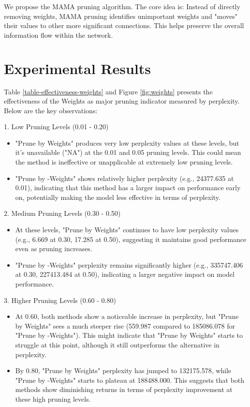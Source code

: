 \documentclass{article} %
\begin{document}
We propose the MAMA pruning algorithm. The core idea is: Instead of directly removing weights, MAMA pruning identifies unimportant weights and "moves" their values to other more significant connections. This helps preserve the overall information flow within the network.

\section{Experimental Results}
\label{res}

Table \ref{table-effectiveness-weights} and Figure \ref{fig:weights} presents the effectiveness of the Weights as major pruning indicator measured by perplexity. Below are the key observations:

1. Low Pruning Levels (0.01 - 0.20)
\begin{itemize}
    \item "Prune by Weights" produces very low perplexity values at these levels, but it's unavailable ("NA") at the 0.01 and 0.05 pruning levels. This could mean the method is ineffective or unapplicable at extremely low pruning levels.
    \item "Prune by -Weights" shows relatively higher perplexity (e.g., 24377.635 at 0.01), indicating that this method has a larger impact on performance early on, potentially making the model less effective in terms of perplexity.
\end{itemize}

2. Medium Pruning Levels (0.30 - 0.50)
\begin{itemize}
    \item At these levels, "Prune by Weights" continues to have low perplexity values (e.g., 6.669 at 0.30, 17.285 at 0.50), suggesting it maintains good performance even as pruning increases.
    \item "Prune by -Weights" perplexity remains significantly higher (e.g., 335747.406 at 0.30, 227413.484 at 0.50), indicating a larger negative impact on model performance.
\end{itemize}

3. Higher Pruning Levels (0.60 - 0.80)
\begin{itemize}
    \item At 0.60, both methods show a noticeable increase in perplexity, but "Prune by Weights" sees a much steeper rise (559.987 compared to 185086.078 for "Prune by -Weights"). This might indicate that "Prune by Weights" starts to struggle at this point, although it still outperforms the alternative in perplexity.
    \item By 0.80, "Prune by Weights" perplexity has jumped to 132175.578, while "Prune by -Weights" starts to plateau at 188488.000. This suggests that both methods show diminishing returns in terms of perplexity improvement at these high pruning levels.
\end{itemize}
\end{document}
